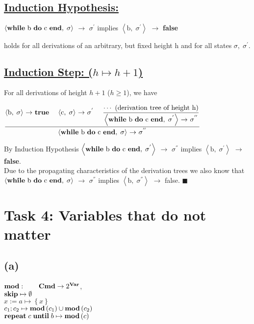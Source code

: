 \documentclass[12pt]{scrartcl}
\newcommand{\eRelation}[2]{$\dfrac{\text{#1}}{\text{#2}}$}
\newcommand{\eState}[2]{$\left\langle \text{#1},\; \text{#2}\right\rangle$}
\newcommand{\eRule}[3]{\eState{#1}{#2} $\rightarrow$ #3}
\begin{document}
		\subsection*{\underline{Induction Hypothesis:}}
		\begin{center}
			\eRule{\textbf{while} b \textbf{do} c \textbf{end}}{$\sigma$}{$\sigma ^{'}$} implies \eRule{b}{$\sigma ^{'}$}{\textbf{false}}
		\end{center}
		\indent\indent holds for all derivations of an arbitrary, but fixed height h and for all states \indent$\sigma , \; \sigma ^{'}$.\\
		\subsection*{\underline{Induction Step: ({\boldmath$h\mapsto h+1$})}}
		\indent\indent For all derivations of height $h+1$ ($h\geq 1$), we have\\
		\begin{center}
			\eRelation
				{\eRule{b}{$\sigma$}{\textbf{true}} \quad \eRule{c}{$\sigma$}{$\sigma ^{'}$} \quad \eRelation{$\cdots$ (derivation tree of height h)}{\eRule{\textbf{while} b \textbf{do} c \textbf{end}}{$\sigma ^{'}$}{$\sigma ^{''}$}}}
				{\eRule{\textbf{while} b \textbf{do} c \textbf{end}}{$\sigma$}{$\sigma ^{''}$}}
		\end{center}
		\indent\indent By Induction Hypothesis \eRule{\textbf{while} b \textbf{do} c \textbf{end}}{$\sigma ^{'}$}{$\sigma ^{''}$} implies \eRule{b}{$\sigma ^{'}$}{\textbf{false}}.\\
		\indent Due to the propagating characteristics of the derivation trees we also know \indent that \eRule{\textbf{while} b \textbf{do} c \textbf{end}}{$\sigma$}{$\sigma ^{''}$} implies \eRule{b}{$\sigma ^{''}$}{false}. \qquad $\blacksquare$
	\section*{Task 4: Variables that do not matter}
	
	\subsection*{(a)}
	
	\indent\indent $\text{\textbf{mod}}: \qquad \text{\textbf{Cmd}}\rightarrow 2^{\text{\textbf{Var}}}$,\\
	\indent $\text{\textbf{skip}}\mapsto\emptyset$\\
	\indent $x:=a\mapsto \left\lbrace x \right\rbrace$\\
	\indent $c_1;c_2\mapsto \text{\textbf{mod}}\left( c_1\right) \cup\text{\textbf{mod}}\left( c_2\right)$\\
	\indent $\text{\textbf{repeat}}\; c\; \text{\textbf{until}}\; b \mapsto \text{\textbf{mod}}\left( c\right)$\\
	
\end{document}
